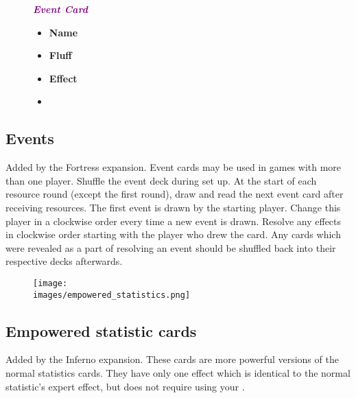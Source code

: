 \begin{wrapfigure}{r}{0.5\textwidth}
  \vspace{0pt}
  \centering
  \begin{scriptsize}
  \end{scriptsize}
  \break
  \footnotesize{\textbf{\textit{\textcolor{purple}{Event Card}}}}
  \scriptsize
  \begin{multicols}{2}
    \begin{itemize}
      \item[\textbf{1.}] \textbf{Name}
      \item[\textbf{2.}] \textbf{Fluff}
      \item[\textbf{3.}] \textbf{Effect}
      \item[\textbf{\phantom{.}}] \phantom{.}
    \end{itemize}
  \end{multicols}
\end{wrapfigure}
\subsection*{Events}
Added by the Fortress expansion.
Event cards may be used in games with more than one player.
Shuffle the event deck during set up.
At the start of each resource round (except the first round), draw and read the next event card after receiving resources.
The first event is drawn by the starting player.
Change this player in a clockwise order every time a new event is drawn.
Resolve any effects in clockwise order starting with the player who drew the card.
Any cards which were revealed as a part of resolving an event should be shuffled back into their respective decks afterwards.

\begin{wrapfigure}{r}{0.5\textwidth}
  \begin{center}
  \texttt{[image: \\images/empowered\_statistics.png]}
  \end{center}
\end{wrapfigure}
\subsection*{Empowered statistic cards}
Added by the Inferno expansion.
These cards are more powerful versions of the normal statistics cards.
They have only one effect which is identical to the normal statistic's expert effect, but does not require using your .


